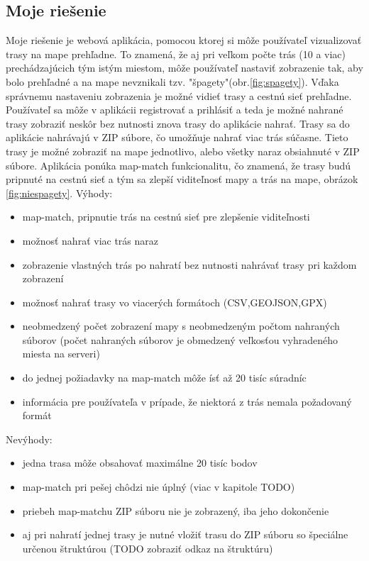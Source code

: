 \subsection{Moje riešenie}
Moje riešenie je webová aplikácia, pomocou ktorej si môže používateľ vizualizovať trasy na mape prehľadne. To znamená, že aj pri veľkom počte trás (10 a viac) prechádzajúcich tým istým miestom, môže používateľ nastaviť zobrazenie tak, aby bolo prehľadné a na mape nevznikali tzv. "špagety"(obr.\ref{fig:spagety}). Vďaka správnemu nastaveniu zobrazenia je možné vidieť trasy a cestnú sieť prehľadne. Používateľ sa môže v aplikácii registrovať a prihlásiť a teda je možné nahrané trasy zobraziť neskôr bez nutnosti znova trasy do aplikácie nahrať. Trasy sa do aplikácie nahrávajú v ZIP súbore, čo umožňuje nahrať viac trás súčasne. Tieto trasy je možné zobraziť na mape jednotlivo, alebo všetky naraz obsiahnuté v ZIP súbore. Aplikácia ponúka map-match funkcionalitu, čo znamená, že trasy budú pripnuté na cestnú sieť a tým sa zlepší viditeľnosť mapy a trás na mape, obrázok \ref{fig:niespagety}. 
\newline Výhody:
\begin{itemize}
  \item map-match, pripnutie trás na cestnú sieť pre zlepšenie viditeľnosti
  \item možnosť nahrať viac trás naraz
  \item zobrazenie vlastných trás po nahratí bez nutnosti nahrávať trasy pri každom zobrazení
  \item možnosť nahrať trasy vo viacerých formátoch (CSV,GEOJSON,GPX)
  \item neobmedzený počet zobrazení mapy s neobmedzeným počtom nahraných súborov (počet nahraných súborov je obmedzený veľkosťou vyhradeného miesta na serveri)
  \item do jednej požiadavky na map-match môže ísť až 20 tisíc súradníc
  \item informácia pre používateľa v prípade, že niektorá z trás nemala požadovaný formát 
\end{itemize}
Nevýhody:
\begin{itemize}
  \item jedna trasa môže obsahovať maximálne 20 tisíc bodov
  \item map-match pri pešej chôdzi nie úplný (viac v kapitole TODO)
  \item priebeh map-matchu ZIP súboru nie je zobrazený, iba jeho dokončenie
  \item aj pri nahratí jednej trasy je nutné vložiť trasu do ZIP súboru so špeciálne určenou štruktúrou (TODO zobraziť odkaz na štruktúru)
\end{itemize}
